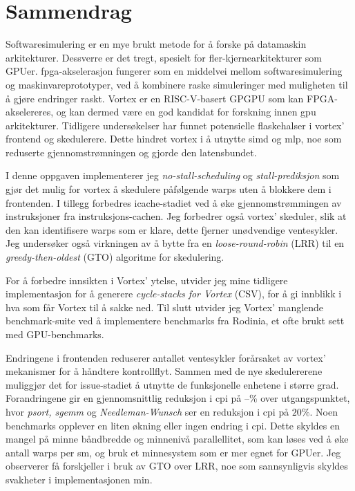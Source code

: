 \chapter*{Sammendrag}

Softwaresimulering er en mye brukt metode for å forske på datamaskin arkitekturer. Dessverre er det tregt, spesielt for fler-kjernearkitekturer som GPUer. \acrshort{fpga}-akselerasjon fungerer som en middelvei mellom softwaresimulering og maskinvareprototyper, ved å kombinere raske simuleringer med muligheten til å gjøre endringer raskt. Vortex er en RISC-V-basert GPGPU som kan FPGA-akselereres, og kan dermed være en god kandidat for forskning innen \acrshort{gpu} arkitekturer. Tidligere undersøkelser har funnet potensielle flaskehalser i \Gls{vortex}’ frontend og skedulerere. Dette hindret \Gls{vortex} i å utnytte \acrshort{simd} og \acrshort{mlp}, noe som reduserte gjennomstrømningen og gjorde den latensbundet.

I denne oppgaven implementerer jeg \textit{no-stall-scheduling} og \textit{stall-prediksjon} som gjør det mulig for \Gls{vortex} å skedulere påfølgende warps uten å blokkere dem i frontenden. I tillegg forbedres icache-stadiet ved å øke gjennomstrømmingen av instruksjoner fra instruksjons-cachen. Jeg forbedrer også
\Gls{vortex}’ skeduler, slik at den kan identifisere warps som er klare, dette fjerner unødvendige ventesykler. Jeg undersøker også virkningen av å bytte fra en \textit{loose-round-robin} (LRR) til en \textit{greedy-then-oldest} (GTO) algoritme for skedulering.

For å forbedre innsikten i Vortex’ ytelse, utvider jeg mine tidligere
implementasjon for å generere \textit{cycle-stacks for Vortex} (CSV), for å gi innblikk i
hva som får Vortex til å sakke ned. Til slutt utvider jeg Vortex' manglende benchmark-suite
ved å implementere benchmarks fra Rodinia, et ofte brukt sett med GPU-benchmarks.

Endringene i frontenden reduserer antallet ventesykler forårsaket av \Gls{vortex}'
mekanismer for å håndtere kontrollflyt. Sammen med de nye skedulererene muliggjør det for
issue-stadiet å utnytte de funksjonelle enhetene i større grad. Forandringene
gir en gjennomsnittlig reduksjon i \acrshort{cpi} på –\% over utgangspunktet, hvor \textit{psort, sgemm} og
\textit{Needleman-Wunsch} ser en reduksjon i \acrshort{cpi} på $20\%$. Noen benchmarks
opplever en liten økning eller ingen endring i \acrshort{cpi}. Dette skyldes en mangel på minne
båndbredde og minnenivå parallellitet, som kan løses ved å øke antall warps per
\acrshort{sm}, og bruk et minnesystem som er mer egnet for GPUer. Jeg observerer få forskjeller i bruk av
GTO over LRR, noe som sannsynligvis skyldes svakheter i implementasjonen min.